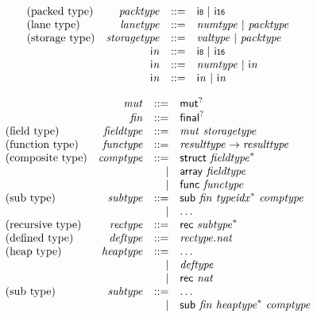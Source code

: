 $$
\begin{array}{@{}lrrl@{}l@{}}
\mbox{(packed type)} & {\mathit{packtype}} &::=& \mathsf{i{\scriptstyle8}} ~|~ \mathsf{i{\scriptstyle16}} \\
\mbox{(lane type)} & {\mathit{lanetype}} &::=& {\mathit{numtype}} ~|~ {\mathit{packtype}} \\
\mbox{(storage type)} & {\mathit{storagetype}} &::=& {\mathit{valtype}} ~|~ {\mathit{packtype}} \\
& {\mathsf{i}}{{\mathit{n}}} &::=& \mathsf{i{\scriptstyle8}} ~|~ \mathsf{i{\scriptstyle16}} \\
& {\mathsf{i}}{{\mathit{n}}} &::=& {\mathit{numtype}} ~|~ {\mathsf{i}}{{\mathit{n}}} \\
& {\mathsf{i}}{{\mathit{n}}} &::=& {\mathsf{i}}{{\mathit{n}}} ~|~ {\mathsf{i}}{{\mathit{n}}} \\
\end{array}
$$

\vspace{1ex}

$$
\begin{array}{@{}lrrl@{}l@{}}
& {\mathit{mut}} &::=& {\mathsf{mut}^?} \\
& {\mathit{fin}} &::=& {\mathsf{final}^?} \\
\mbox{(field type)} & {\mathit{fieldtype}} &::=& {\mathit{mut}}~{\mathit{storagetype}} \\
\mbox{(function type)} & {\mathit{functype}} &::=& {\mathit{resulttype}} \rightarrow {\mathit{resulttype}} \\
\mbox{(composite type)} & {\mathit{comptype}} &::=& \mathsf{struct}~{{\mathit{fieldtype}}^\ast} \\ &&|&
\mathsf{array}~{\mathit{fieldtype}} \\ &&|&
\mathsf{func}~{\mathit{functype}} \\
\mbox{(sub type)} & {\mathit{subtype}} &::=& \mathsf{sub}~{\mathit{fin}}~{{\mathit{typeidx}}^\ast}~{\mathit{comptype}} \\ &&|&
\dots \\
\mbox{(recursive type)} & {\mathit{rectype}} &::=& \mathsf{rec}~{{\mathit{subtype}}^\ast} \\
\mbox{(defined type)} & {\mathit{deftype}} &::=& {\mathit{rectype}} . {\mathit{nat}} \\
\mbox{(heap type)} & {\mathit{heaptype}} &::=& \dots \\ &&|&
{\mathit{deftype}} \\ &&|&
\mathsf{rec}~{\mathit{nat}} \\
\mbox{(sub type)} & {\mathit{subtype}} &::=& \dots \\ &&|&
\mathsf{sub}~{\mathit{fin}}~{{\mathit{heaptype}}^\ast}~{\mathit{comptype}} \\
\end{array}
$$

